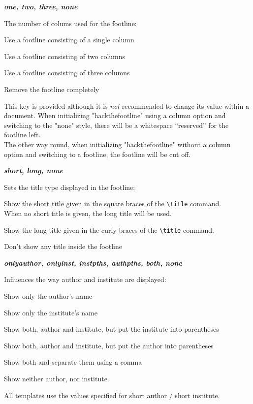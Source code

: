 \documentclass[11pt]{ltxdoc}
\newcommand{\DescribeOption}[3]{
  \DescribeMacro{#1}
  \begin{minipage}[t]{\textwidth}
    \textit{\textbf{#2}}\dotfill~\par
    \begingroup
    \vspace{0.5em}#3\par
    \endgroup
  \end{minipage}%
  \bigskip\medskip%
}
\begin{document}
	\bigskip
	\DescribeOption{cols}{one, two, three, none}{%
		The number of colums used for the footline:
		\begin{description}\itemsep0pt
			\item[one]
				Use a footline consisting of a single column
			\item[two]
				Use a footline consisting of two columns
			\item[three]
				Use a footline consisting of three columns
			\item[none]
				Remove the footline completely
		\end{description}
		This key is provided although it is \emph{not} recommended to change its value within a document.
		When initializing "hackthefootline" using a column option and switching to the "none" style, there will be a whitespace \enquote{reserved} for the footline left. \\
		The other way round, when initializing "hackthefootline" without a column option and switching to a footline, the footline will be cut off.
	}
	
	\DescribeOption{title}{short, long, none}{%
		Sets the title type displayed in the footline:
		\begin{description}\itemsep0pt
			\item[short]
				Show the short title given in the square braces of the \texttt{\textbackslash title} command. \\
				When no short title is given, the long title will be used.
			\item[long]
				Show the long title given in the curly braces of the \texttt{\textbackslash title} command.
			\item[none]
				Don't show any title inside the footline
		\end{description}}
	
	\DescribeOption{authinst}{onlyauthor, onlyinst, instpths, authpths, both, none}{%
		Influences the way author and institute are displayed:
		\begin{description}\itemsep0pt
			\item[onlyauthor]
				Show only the author's name
			\item[onlyinst]
				Show only the institute's name
			\item[instpths]
				Show both, author and institute, but put the institute into parentheses
			\item[authpths]
				Show both, author and institute, but put the author into parentheses
			\item[both]
				Show both and separate them using a comma
			\item[none]
				Show neither author, nor institute
		\end{description}
		All templates use the values specified for short author / short institute.
	}
	
\end{document}

